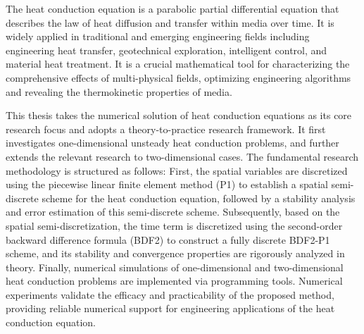 \documentclass{GZUbachelorthesis}
\theoremstyle{chineseplain}
\begin{document}
\maketitle %

\begin{tocabstract} %
\begin{abstract}[热传导方程，有限元方法，稳定性，误差估计，数值实验] %
热传导方程是描述介质内部热量随时间扩散传递规律的抛物型偏微分方程，广泛应用于工程传热、岩土勘探、智能控制、材料热处理等传统与新兴工程领域，是刻画多物理场综合作用、优化工程算法和揭示介质热动力学特性的重要数学工具。

本文以热传导方程的数值解法为核心研究内容，由理论到实践的研究思路，从一维非稳态热传导问题出发，并进一步将数值方法推广至二维情形。研究的基本思路如下：首先，基于分片线性有限元方法（P1）对空间变量进行离散，建立热传导方程的空间半离散格式，并对该半离散格式进行稳定性分析与误差估计；然后，在空间半离散的基础上，进一步在时间项采用二阶向后差分格式（BDF2）进行离散，构造全离散的BDF2-P1格式，并从理论上严格分析其稳定性与收敛性质；最后，借助编程工具实现一维和二维热传导问题的数值模拟，通过数值实验验证所提方法的有效性与实用性，为热传导方程的工程实际应用提供可靠的数值支撑。
\end{abstract}
\begin{enabstract} %
The heat conduction equation is a parabolic partial differential equation that describes the law of heat diffusion and transfer within media over time. It is widely applied in traditional and emerging engineering fields including engineering heat transfer, geotechnical exploration, intelligent control, and material heat treatment. It is a crucial mathematical tool for characterizing the comprehensive effects of multi-physical fields, optimizing engineering algorithms and revealing the thermokinetic properties of media.
	
This thesis takes the numerical solution of heat conduction equations as its core research focus and adopts a theory-to-practice research framework. It first investigates one-dimensional unsteady heat conduction problems, and further extends the relevant research to two-dimensional cases. The fundamental research methodology is structured as follows: First, the spatial variables are discretized using the piecewise linear finite element method (P1) to establish a spatial semi-discrete scheme for the heat conduction equation, followed by a stability analysis and error estimation of this semi-discrete scheme. Subsequently, based on the spatial semi-discretization, the time term is discretized using the second-order backward difference formula (BDF2) to construct a fully discrete BDF2-P1 scheme, and its stability and convergence properties are rigorously analyzed in theory. Finally, numerical simulations of one-dimensional and two-dimensional heat conduction problems are implemented via programming tools. Numerical experiments validate the efficacy and practicability of the proposed method, providing reliable numerical support for engineering applications of the heat conduction equation.
\end{enabstract}
\end{tocabstract}
\end{document}
